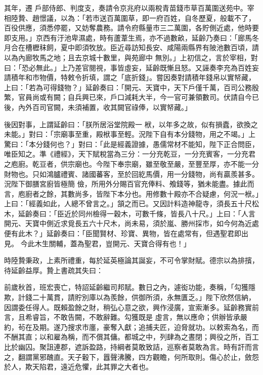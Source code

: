 \begin{pinyinscope}
 其年，遷
 戶部侍郎、判度支，奏請令京兆府以兩稅青苗錢市草百萬圍送苑中。宰相陸贄、趙憬議，以為：「若市送百萬圍草，即一府百姓，自冬歷夏，般載不了，百役供應，須悉停罷，又妨奪農務。請令府縣量市三二萬圍，各貯側近處，他時要即支用。」京西有汙池卑濕處，時有蘆葦生焉，亦不過數畝，延齡乃奏曰：「廊馬冬月合在槽櫪秣飼，夏中即須牧放。臣近尋訪知長安、咸陽兩縣界有陂池數百頃，請以為內廊牧馬之地；且去京城十數里，與苑廊中
 無別。」上初信之，言於宰相，對曰：「恐必無此。」上乃差官閱視，事皆虛妄，延齡既慚且怒。又誣奏李充為百姓妄請積年和市物價，特敕令折填，謂之「底折錢」。嘗因奏對請積年錢帛以實帑藏，上曰：「若為可得錢物？」延齡奏曰：「開元、天寶中，天下戶僅千萬，百司公務殷繁，官員尚或有闕；自兵興已來，戶口減耗大半，今一官可兼領數司。伏請自今已後，內外百司官闕，未須補置，收其闕官祿俸，以實帑藏。」



 後因對事，上謂延齡曰：「朕所居浴堂院殿一
 栿，以年多之故，似有損蠹，欲換之未能。」對曰：「宗廟事至重，殿栿事至輕。況陛下自有本分錢物，用之不竭。」上驚曰：「本分錢何也？」對曰：「此是經義證據，愚儒常材不能知，陛下正合問臣，唯臣知之。準《禮經》，天下賦稅當為三分：一分充乾豆，一分充賓客，一分充君之庖廚。乾豆者，供宗廟也。今陛下奉宗廟，雖至敬至嚴，至豐至厚，亦不能一分財物也。只如鴻臚禮賓、諸國蕃客，至於回紇馬價，用一分錢物，尚有贏羨甚多。況陛下御膳宮廚皆極簡
 儉，所用外分賜百官充俸料、飧錢等，猶未能盡。據此而言，庖廚者之餘，其數尚多，皆陛下本分也。用修數十殿亦不合疑慮，何況一栿。」上曰：「經義如此，人總不曾言之。」頷之而已。又因計料造神龍寺，須長五十尺松木，延齡奏曰：「臣近於同州檢得一穀木，可數千條，皆長八十尺。」上曰：「人言開元、天寶中側近求覓長五六十尺木，尚未易，須於嵐、勝州採市，如今何為近處便有此木？」延齡奏曰：「臣聞賢材、珍寶、異物，皆在處常有，但遇聖君即出見。
 今此木生關輔，蓋為聖君，豈開元、天寶合得有也！」



 時陸贄秉政，上素所禮重，每於延英極論其誕妄，不可令掌財賦。德宗以為排擯，待延齡益厚。贄上書疏其失曰：



 前歲秋首，班宏喪亡，特詔延齡繼司邦賦。數日之內，遽衒功能，奏稱，「勾獲隱欺，計錢二十萬貫，請貯別庫以為羨餘，供御所須，永無匱乏。」陛下欣然信納，因謂委任得人。既賴盈餘之財，稍弘心意之欲，興作浸廣，宣索漸多。延齡務實前言，且希睿旨，不敢告闕，不敢辭難。勾獲既是
 虛言，無以應命；供辦皆承嚴約，茍在及期。遂乃搜求市廛，豪奪入獻；追捕夫匠，迫脅就功。以敕索為名，而不酬其直；以和雇為稱，而不償其傭。都城之中，列肆為之晝閉；興役之所，百工比於幽囚。聚詛連郡，遮訴盈路，持綱者莫敢致詰，巡察者莫敢為言。時有訐而言之，翻謂黨邪醜直。天子轂下，囂聲沸騰，四方觀瞻，何所取則。傷心於止，斂怨於人，欺天陷君，遠近危懼，此其罪之大者也。




\end{pinyinscope}

